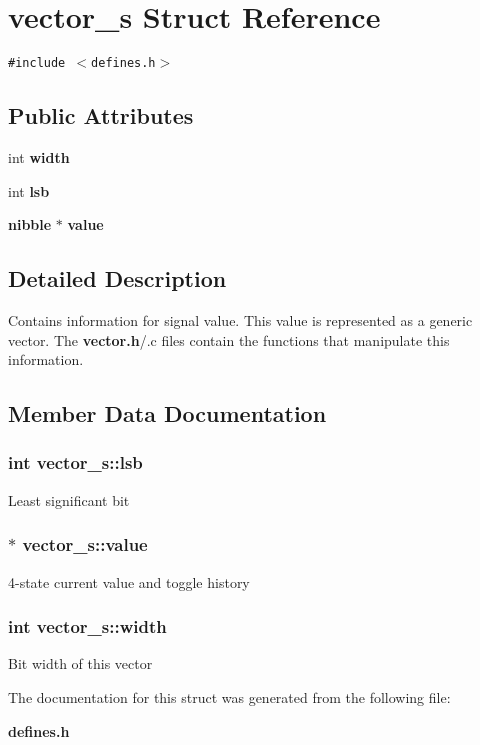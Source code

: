 \section{vector\_\-s Struct Reference}
\label{structvector__s}
{\tt \#include $<$defines.h$>$}

\subsection*{Public Attributes}
\begin{CompactItemize}
\item 
int {\bf width}
\item 
int {\bf lsb}
\item 
{\bf nibble} $\ast$ {\bf value}
\end{CompactItemize}


\subsection{Detailed Description}
Contains information for signal value. This value is represented as a generic vector. The {\bf vector.h}/.c files contain the functions that manipulate this information. 



\subsection{Member Data Documentation}
\subsubsection{\setlength{\rightskip}{0pt plus 5cm}int vector\_\-s::lsb}\label{structvector__s_m1}


Least significant bit 
\subsubsection{$\ast$ vector\_\-s::value}\label{structvector__s_m2}


4-state current value and toggle history 
\subsubsection{\setlength{\rightskip}{0pt plus 5cm}int vector\_\-s::width}\label{structvector__s_m0}


Bit width of this vector 

The documentation for this struct was generated from the following file:\begin{CompactItemize}
\item 
{\bf defines.h}\end{CompactItemize}
